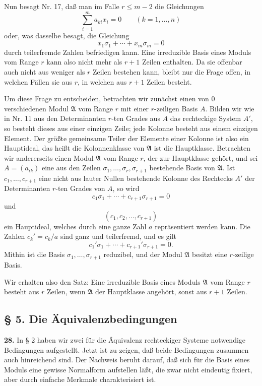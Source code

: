 \documentclass[11pt,a4paper]{article}
\begin{document}
Nun besagt Nr. 17, daß man im Falle \(r\le m-2\) die Gleichungen
\[
 \sum_{i=1}^{m}a_{ki}x_i=0\qquad(k=1,\ldots,n)
\]
oder, was dasselbe besagt, die Gleichung
\[
 x_1\sigma_1+\cdots+x_m\sigma_m=0
\]
durch teilerfremde Zahlen befriedigen kann. Eine irreduzible Basis eines Moduls vom Range \(r\) kann also nicht mehr als \(r+1\) Zeilen enthalten. Da sie offenbar auch nicht aus weniger als \(r\) Zeilen bestehen kann, bleibt nur die Frage offen, in welchen Fällen sie aus \(r\), in welchen aus \(r+1\) Zeilen besteht.

Um diese Frage zu entscheiden, betrachten wir zunächst einen von \(0\) verschiedenen Modul \(\mathfrak A\) vom Range \(r\) mit einer \(r\)-zeiligen Basis \(A\). Bilden wir wie in Nr. 11 aus den Determinanten \(r\)-ten Grades aus \(A\) das rechteckige System \(A'\), so besteht dieses aus einer einzigen Zeile; jede Kolonne besteht aus einem einzigen Element. Der größte gemeinsame Teiler der Elemente einer Kolonne ist also ein Hauptideal, das heißt die Kolonnenklasse von \(\mathfrak A\) ist die Hauptklasse. Betrachten wir andererseits einen Modul \(\mathfrak A\) vom Range \(r\), der zur Hauptklasse gehört, und sei \(A=(a_{ik})\) eine aus den Zeilen \(\sigma_1,\ldots,\sigma_r,\sigma_{r+1}\) bestehende Basis von \(\mathfrak A\). Ist \(c_1,\ldots,c_{r+1}\) eine nicht aus lauter Nullen bestehende Kolonne des Rechtecks \(A'\) der Determinanten \(r\)-ten Grades von \(A\), so wird
\[
 c_1\sigma_1+\cdots+c_{r+1}\sigma_{r+1}=0 \tag{29}
\]
und
\[
 (c_1,c_2,\ldots,c_{r+1}) \tag{30}
\]
ein Hauptideal, welches durch eine ganze Zahl \(a\) repräsentiert werden kann. Die Zahlen \(c_k'=c_k/a\) sind ganz und teilerfremd, und es gilt
\[
 c_1'\sigma_1+\cdots+c_{r+1}'\sigma_{r+1}=0.
\]
Mithin ist die Basis \(\sigma_1,\ldots,\sigma_{r+1}\) reduzibel, und der Modul \(\mathfrak A\) besitzt eine \(r\)-zeilige Basis.

Wir erhalten also den Satz: Eine irreduzible Basis eines Moduls \(\mathfrak A\) vom Range \(r\) besteht aus \(r\) Zeilen, wenn \(\mathfrak A\) der Hauptklasse angehört, sonst aus \(r+1\) Zeilen.

\subsection*{§ 5. Die Äquivalenzbedingungen}

\textbf{28.} In § 2 haben wir zwei für die Äquivalenz rechteckiger Systeme notwendige Bedingungen aufgestellt. Jetzt ist zu zeigen, daß beide Bedingungen zusammen auch hinreichend sind. Der Nachweis beruht darauf, daß sich für die Basis eines Moduls eine gewisse Normalform aufstellen läßt, die zwar nicht eindeutig fixiert, aber durch einfache Merkmale charakterisiert ist.
\end{document}
